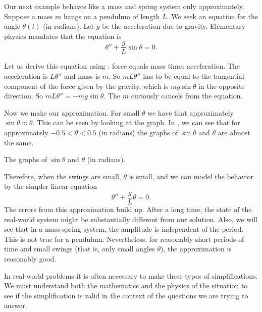 \medskip

\begin{mywrapfigsimp}[10]{1.8in}{2.16in}
\noindent
{}
\end{mywrapfigsimp}
Our next example behaves like a mass and spring system only
approximately. Suppose a
mass $m$ hangs on a pendulum of length $L$.  We seek an equation for
the angle $\theta(t)$ (in radians).  Let $g$ be the acceleration due to gravity.
Elementary physics mandates that the equation is
\begin{equation*}
\theta'' + \frac{g}{L} \sin \theta = 0 .
\end{equation*}

Let us derive this equation using :
force equals mass times acceleration.  The acceleration is
$L \theta''$ and mass is $m$.  So $mL\theta''$ has to be equal
to the tangential component of the force given by the gravity, which is
$m g \sin \theta$ in the opposite direction.
So $mL\theta'' = -mg \sin \theta$.
The $m$ curiously cancels from the equation.

Now we make our approximation.  For small $\theta$ we have that approximately
$\sin \theta \approx \theta$.  This can be seen by looking at the graph.
In , we can see that for approximately
$-0.5 < \theta < 0.5$ (in radians) the graphs of $\sin \theta$ and $\theta$ are almost the
same.

\begin{mywrapfig}{3.25in}
\capstart
{}
\caption{The graphs of $\sin \theta$ and $\theta$ (in radians).\label{mv:sinthetafig}}
\end{mywrapfig}

Therefore, when the swings are small, $\theta$ is small, and we can
model the behavior by the simpler linear equation
\begin{equation*}
\theta'' + \frac{g}{L} \theta = 0 .
\end{equation*}
The errors from this approximation build up.
After a
long time, the state of the real-world system might be substantially
different from our solution.  Also, we will
see that in a mass-spring system, the amplitude is independent of the
period.
This is not true for a pendulum.  Nevertheless, for reasonably short periods of time
and small swings (that is, only small angles $\theta$),
the approximation is reasonably good.

In real-world problems it is often necessary to make these types of
simplifications.  We must understand both the mathematics and
the physics of the situation to see if the simplification is valid in the
context of the questions we are trying to answer.


